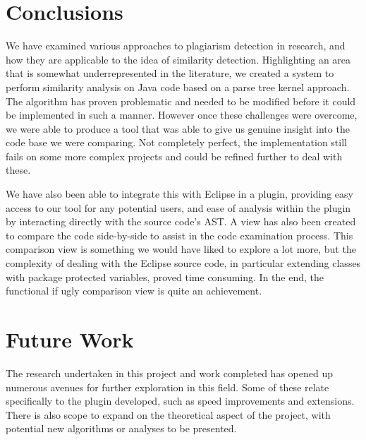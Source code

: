 \chapter{Conclusions}

We have examined various approaches to plagiarism detection in research,
and how they are applicable to the idea of similarity detection.
Highlighting an area that is somewhat underrepresented in the literature,
we created a system to perform similarity analysis on Java code based on a 
parse tree kernel approach. The algorithm has proven problematic and needed
to be modified before it could be implemented in such a manner.
However once these challenges were overcome, we were able to produce a tool
that was able to give us genuine insight into the code base we were comparing.
Not completely perfect, the implementation still fails on some more complex
projects and could be refined further to deal with these.

We have also been able to integrate this with Eclipse in a plugin, providing
easy access to our tool for any potential users, and ease of analysis within
the plugin by interacting directly with the source code's AST. A view has
also been created to compare the code side-by-side to assist in the code
examination process. This comparison view is something we would have liked
to explore a lot more, but the complexity of dealing with the Eclipse 
source code, in particular extending classes with package protected variables,
proved time consuming. In the end, the functional if ugly comparison view
is quite an achievement.

\chapter{Future Work}
\label{Future Work}

The research undertaken in this project and work completed has opened up
numerous avenues for further exploration in this field. Some of these
relate specifically to the plugin developed, such as speed improvements and extensions.
There is also scope to expand on the theoretical aspect of the project, with potential
new algorithms or analyses to be presented.

